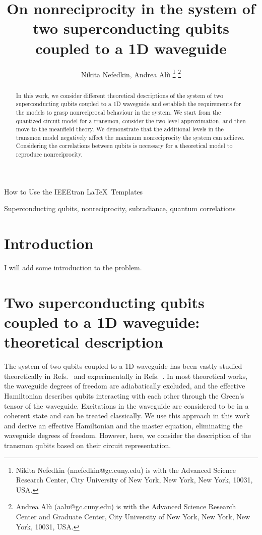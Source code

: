 \documentclass[lettersize,journal]{IEEEtran}
\begin{document}
\title{On nonreciprocity in the system of two superconducting qubits coupled to a 1D waveguide}
\author{Nikita Nefedkin, Andrea Al{\`u} 
\thanks{Nikita Nefedkin (nnefedkin@gc.cuny.edu) is with the Advanced Science Research Center, City University of New York, New York, New York, 10031, USA.}
\thanks{Andrea Al\`u (aalu@gc.cuny.edu) is with the Advanced Science Research Center and Graduate Center, City University of New York, New York, New York, 10031, USA.}}

%
{How to Use the IEEEtran \LaTeX \ Templates}

\maketitle

\begin{abstract}
In this work, we consider different theoretical descriptions of the system of two superconducting qubits coupled to a 1D waveguide and establish the requirements for the models to grasp nonreciprocal behaviour in the system. We start from the quantized circuit model for a transmon, consider the two-level approximation, and then move to the meanfield theory. We demonstrate that the additional levels in the transmon model negatively affect the maximum nonreciprocity the system can achieve. Considering the correlations between qubits is necessary for a theoretical model to reproduce nonreciprocity.
\end{abstract}

\begin{IEEEkeywords}
Superconducting qubits, nonreciprocity, subradiance, quantum correlations
\end{IEEEkeywords}


\section{Introduction}
 I will add some introduction to the problem.


\section{Two superconducting qubits coupled to a 1D waveguide: theoretical description}
\noindent The system of two qubits coupled to a 1D waveguide has been vastly studied theoretically in Refs.~\cite{muller_nonreciprocal_2017, dai_rectification_2015, Nefedkin2022, trivedi_fano-qubits_2023, lalumiere_input-output_2013} and experimentally in Refs.~\cite{rosario_hamann_nonreciprocity_2018}. 
In most theoretical works, the waveguide degrees of freedom are adiabatically excluded, and the effective Hamiltonian describes qubits interacting with each other through the Green's tensor of the waveguide.
Excitations in the waveguide are considered to be in a coherent state and can be treated classically.
We use this approach in this work and derive an effective Hamiltonian and the master equation, eliminating the waveguide degrees of freedom.
However, here, we consider the description of the transmon qubits based on their circuit representation.
\end{document}
